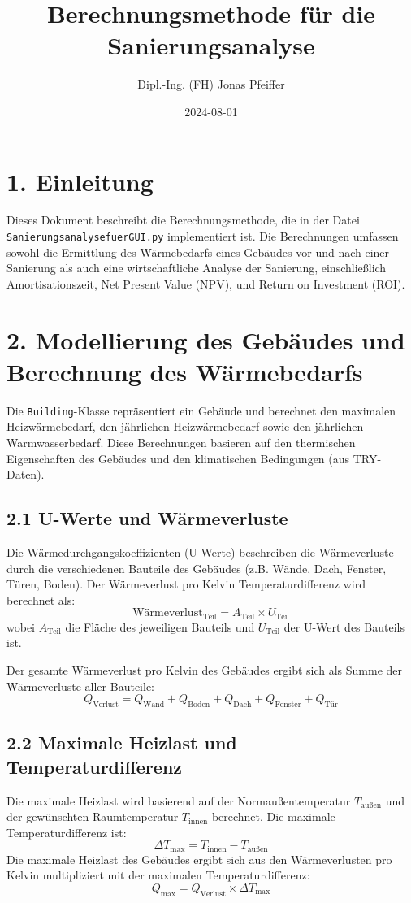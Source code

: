 \documentclass{article}
\title{Berechnungsmethode für die Sanierungsanalyse}
\author{Dipl.-Ing. (FH) Jonas Pfeiffer}
\date{2024-08-01}
\begin{document}
\maketitle

\section*{1. Einleitung}
Dieses Dokument beschreibt die Berechnungsmethode, die in der Datei \texttt{SanierungsanalysefuerGUI.py} implementiert ist. Die Berechnungen umfassen sowohl die Ermittlung des Wärmebedarfs eines Gebäudes vor und nach einer Sanierung als auch eine wirtschaftliche Analyse der Sanierung, einschließlich Amortisationszeit, Net Present Value (NPV), und Return on Investment (ROI). 

\section*{2. Modellierung des Gebäudes und Berechnung des Wärmebedarfs}
Die \texttt{Building}-Klasse repräsentiert ein Gebäude und berechnet den maximalen Heizwärmebedarf, den jährlichen Heizwärmebedarf sowie den jährlichen Warmwasserbedarf. Diese Berechnungen basieren auf den thermischen Eigenschaften des Gebäudes und den klimatischen Bedingungen (aus TRY-Daten).

\subsection*{2.1 U-Werte und Wärmeverluste}
Die Wärmedurchgangskoeffizienten (U-Werte) beschreiben die Wärmeverluste durch die verschiedenen Bauteile des Gebäudes (z.B. Wände, Dach, Fenster, Türen, Boden). Der Wärmeverlust pro Kelvin Temperaturdifferenz wird berechnet als:
\[
\text{Wärmeverlust}_\text{Teil} = A_\text{Teil} \times U_\text{Teil}
\]
wobei \( A_\text{Teil} \) die Fläche des jeweiligen Bauteils und \( U_\text{Teil} \) der U-Wert des Bauteils ist.

Der gesamte Wärmeverlust pro Kelvin des Gebäudes ergibt sich als Summe der Wärmeverluste aller Bauteile:
\[
Q_{\text{Verlust}} = Q_{\text{Wand}} + Q_{\text{Boden}} + Q_{\text{Dach}} + Q_{\text{Fenster}} + Q_{\text{Tür}}
\]

\subsection*{2.2 Maximale Heizlast und Temperaturdifferenz}
Die maximale Heizlast wird basierend auf der Normaußentemperatur \( T_{\text{außen}} \) und der gewünschten Raumtemperatur \( T_{\text{innen}} \) berechnet. Die maximale Temperaturdifferenz ist:
\[
\Delta T_{\text{max}} = T_{\text{innen}} - T_{\text{außen}}
\]
Die maximale Heizlast des Gebäudes ergibt sich aus den Wärmeverlusten pro Kelvin multipliziert mit der maximalen Temperaturdifferenz:
\[
Q_{\text{max}} = Q_{\text{Verlust}} \times \Delta T_{\text{max}}
\]
\end{document}
